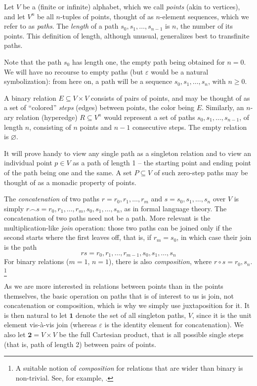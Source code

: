 \documentclass{llncs}
\newcommand{\ABC}{V}
\newcommand{\Pair}{\textbf{2}}
\newcommand{\One}{\textbf{1}}
\begin{document}
Let $\ABC$ be a (finite or infinite) alphabet, which we call
\emph{points} (akin to vertices), and let $\ABC^n$ be all $n$-tuples
of points, thought of as $n$-element sequences, which we refer to as
\emph{paths}.  The \emph{length} of a path $s_0,s_1,\ldots,s_{n-1}$ is
$n$, the number of its points.  This definition of
length, although unusual, generalizes best to transfinite paths.

Note that the path $s_0$ has length
one, the empty path being obtained for $n=0$.  We
will have no recourse to empty paths (but $\varepsilon$ would be a
natural symbolization): from here on, a path will be a sequence $s_0,
s_1, \ldots, s_n$, with $n\geq 0$.

A binary relation $E\subseteq\ABC\times\ABC$ consists of pairs of
points, and may be thought of as a set of ``colored'' \emph{steps}
(edges) between points, the color being $E$.  Similarly, an $n$-ary
relation (hyperedge) $R\subseteq \ABC^n$ would represent a set of
paths $s_0,s_1,\ldots,s_{n-1}$, of length $n$, consisting of $n$
points and $n-1$ consecutive steps.  The empty relation is
$\varnothing$.

It will prove handy to view any single path as a singleton relation
and to view an individual point $p\in\ABC$ as a path of length 1 -- the
starting point and ending point of the path being one and the same.  A
set $P\subseteq\ABC$ of such zero-step paths may be thought of as a
monadic property of points. 


The \emph{concatenation} of two paths $r=r_0,r_1,\ldots,r_m$ and
$s=s_0,s_1,\ldots,s_n$ over $\ABC$ is simply $r\smallfrown
s=r_0,r_1,\ldots,r_m,s_0,s_1,\ldots,s_n$, as in formal language
theory. The concatenation of two paths need not be a path. More
relevant is the multiplication-like \emph{join} operation: those two
paths can be joined only if the second starts where the first leaves
off, that is, if $r_m=s_0$, in which case their join is the path
\[
r s = r_0,r_1,\ldots,r_{m-1},s_0,s_1,\ldots,s_n
\]
For binary relations ($m=1$, $n=1$), there is also \emph{composition},
where $r\circ s= r_0,s_n$.%
\footnote{A suitable notion of \emph{composition} for relations that
  are wider than binary is non-trivial.  See, for example, \cite{Marx}.}

As we are more interested in relations between points than in the
points themselves, the basic operation on paths that is of interest to
us is join, not concatenation or composition, which is why we simply
use juxtaposition for it.  It is then natural to let $\One$ denote the
set of all singleton paths, $\ABC$, since it is the unit element
vis-\`a-vis join (whereas $\varepsilon$ is the identity element for
concatenation).  We also let $\Pair=\ABC\times\ABC$ be the full
Cartesian product, that is all possible single steps (that is, path of
length 2) between pairs of points.
\end{document}
